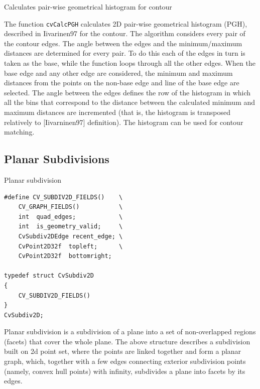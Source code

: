 \label{CalcPGH}

Calculates pair-wise geometrical histogram for contour


\begin{description}
\end{description}

The function \texttt{cvCalcPGH} calculates
2D pair-wise geometrical histogram (PGH), described in
Iivarinen97
for the contour. The algorithm considers every pair of the contour
edges. The angle between the edges and the minimum/maximum distances
are determined for every pair. To do this each of the edges in turn
is taken as the base, while the function loops through all the other
edges. When the base edge and any other edge are considered, the minimum
and maximum distances from the points on the non-base edge and line of
the base edge are selected. The angle between the edges defines the row
of the histogram in which all the bins that correspond to the distance
between the calculated minimum and maximum distances are incremented
(that is, the histogram is transposed relatively to [Iivarninen97]
definition). The histogram can be used for contour matching.

\subsection{Planar Subdivisions}

\label{CvSubdiv2D}

Planar subdivision

\begin{lstlisting}
#define CV_SUBDIV2D_FIELDS()    \
    CV_GRAPH_FIELDS()           \
    int  quad_edges;            \
    int  is_geometry_valid;     \
    CvSubdiv2DEdge recent_edge; \
    CvPoint2D32f  topleft;      \
    CvPoint2D32f  bottomright;

typedef struct CvSubdiv2D
{
    CV_SUBDIV2D_FIELDS()
}
CvSubdiv2D;
\end{lstlisting}

Planar subdivision is a subdivision of a plane into a set of
non-overlapped regions (facets) that cover the whole plane. The above
structure describes a subdivision built on 2d point set, where the points
are linked together and form a planar graph, which, together with a few
edges connecting exterior subdivision points (namely, convex hull points)
with infinity, subdivides a plane into facets by its edges.

